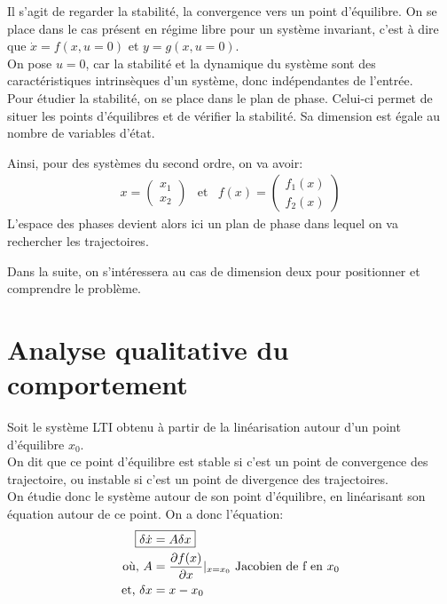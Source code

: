 \documentclass[main.tex]{subfiles}
\begin{document}
Il s'agit de regarder la stabilité, la convergence vers un point d'équilibre. On se place dans le cas présent  en régime libre pour un système invariant, c'est à dire que $\dot{x} = f(x,u=0)$ et $y = g(x,u=0)$.\\


On pose $u=0$, car la stabilité et la dynamique du système sont des caractéristiques intrinsèques d'un système, donc indépendantes de l'entrée.\\

Pour étudier la stabilité, on se place dans le plan de phase. Celui-ci permet de situer les points d'équilibres et de vérifier la stabilité. Sa dimension est égale au nombre de variables d'état.

Ainsi, pour des systèmes du second ordre, on va avoir:
\[\begin{matrix}
x= \begin{pmatrix}x_1\\x_2\end{pmatrix} &\text{et}& f(x)=\begin{pmatrix}f_1(x)\\f_2(x)\end{pmatrix}
\end{matrix}\]
L'espace des phases devient alors ici un plan de phase dans lequel on va rechercher les trajectoires.

Dans la suite, on s'intéressera au cas de dimension deux pour positionner et comprendre le problème.

\section{Analyse qualitative du comportement}
Soit le système LTI obtenu à partir de la linéarisation autour d'un point d'équilibre $x_0$.\\
On dit que ce point d'équilibre est stable si c'est un point de convergence des trajectoire, ou instable si c'est un point de divergence des trajectoires.\\

On étudie donc le système autour de son point d'équilibre, en linéarisant son équation autour de ce point. On a donc l'équation:
\begin{align*}
\Aboxed{\delta \dot{x}&= A \delta x}\\
\text{où, } A&= \frac{\partial f(x)}{\partial x}|_{x=x_0} \text{	Jacobien de f en $x_0$}\\
\text{et, }\delta x &= x-x_0
\end{align*}
\end{document}
